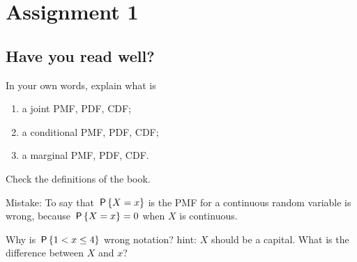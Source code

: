 \documentclass[../../assignments/assignments]{subfiles}
\begin{document}
\section{Assignment 1}


\subsection{Have you read well?}


\begin{exercise}
In your own words, explain what is
\begin{enumerate}
\item a joint PMF, PDF, CDF;
\item a conditional PMF, PDF, CDF;
\item a marginal PMF, PDF, CDF.
\end{enumerate}
\begin{solution}
Check the definitions of the book.

Mistake: To say that $\P{X=x}$ is the PMF for a continuous random variable is wrong, because $\P{X=x}=0$ when $X$ is continuous.

Why is $\P{1 < x \leq 4}$ wrong notation?
hint: $X$ should be a capital.
What is the difference between $X$ and $x$?

\end{solution}
\end{exercise}
\end{document}
